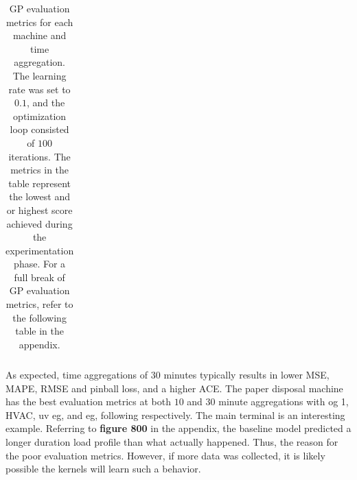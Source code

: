 \begin{table}[htbp]
{\begin{tabular}{lcccccccc}
    \hline
    \end{tabular}}
    \caption{GP evaluation metrics for each machine and time aggregation. The learning rate was set to $0.1$, and the optimization loop consisted of $100$ iterations. The metrics in the table represent the lowest and or highest score achieved during the experimentation phase. For a full break of GP evaluation metrics, refer to the following table in the appendix.}
    \label{tab:tab3}
\end{table}

As expected, time aggregations of $30$ minutes typically results in lower MSE, MAPE, RMSE and pinball loss, and a higher ACE. The paper disposal machine has the best evaluation metrics at both $10$ and $30$ minute aggregations with og 1, HVAC, uv eg, and eg, following respectively. The main terminal is an interesting example. Referring to \textbf{figure 800} in the appendix, the baseline model predicted a longer duration load profile than what actually happened. Thus, the reason for the poor evaluation metrics. However, if more data was collected, it is likely possible the kernels will learn such a behavior. 